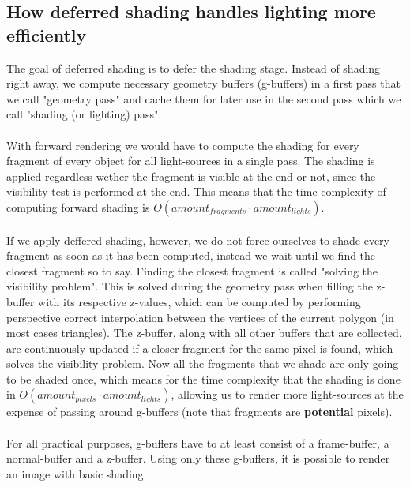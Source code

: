\documentclass{ACGSeminar}
\begin{document}
	\subsection{How deferred shading handles lighting more efficiently}
		The goal of deferred shading is to defer the shading stage. Instead of shading right away, we compute necessary geometry buffers (g-buffers) in a first pass that we call "geometry pass" and cache 
		them for later use in the second pass which we call "shading (or lighting) pass". \\\\
		With forward rendering we would have to compute the shading for every fragment of every object for all light-sources in a single pass. The shading is applied regardless wether the fragment is visible at the end or not, since the visibility test is performed at the end. This means that the time complexity of computing forward shading is $O(amount_{fragments} \cdot amount_{lights})$. \\\\
		If we apply deffered shading, however, we do not force ourselves to shade every fragment as soon as it has been computed, instead we wait until we find the closest fragment so to say. Finding the closest fragment is called "solving the visibility problem". This is solved during the geometry pass when filling the z-buffer with its respective z-values, which can be computed by performing perspective correct interpolation between the vertices of the current polygon (in most cases triangles). The z-buffer, along with all other buffers that are collected, are continuously updated if a closer fragment for the same pixel is found, which solves the visibility problem. Now all the fragments that we shade are only going to be shaded once, which means for the time complexity that the shading is done in $O(amount_{pixels} \cdot amount_{lights})$, allowing us to render more light-sources at the expense of passing around g-buffers (note that fragments are \textbf{potential} pixels). \\\\
		For all practical purposes, g-buffers have to at least consist of a frame-buffer, a normal-buffer and a z-buffer. Using only these g-buffers, it is possible to render an image with basic shading.
\end{document}
